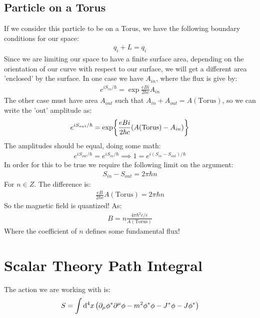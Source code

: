 \documentclass[12pt]{article}
\newcommand{\D}{\partial}
\begin{document}
\subsection{Particle on a Torus}
If we consider this particle to be on a Torus, we have the following boundary conditions for our space:
\begin{align*}
  q_i+L=q_i
\end{align*}
Since we are limiting our space to have a finite surface area, depending on the orientation of our curve with respect to our surface, we will get a different area 'enclosed' by the surface. In one case we have $A_{in}$, where the flux is give by:
\begin{align*}
  e^{iS_{in}/\hbar}=\exp{\frac{eBi}{2\hbar c}A_{in}}
\end{align*}
The other case must have area $A_{out}$ such that $A_{in}+A_{out}=A(\text{Torus})$, so we can write the 'out' amplitude as:
\begin{align*}
  e^{iS_{out}/\hbar}=\exp{\frac{eBi}{2\hbar c}\qty(A(\text{Torus})-A_{in})}
\end{align*}
The amplitudes should be equal, doing some math:
\begin{align*}
  e^{iS_{out}/\hbar}=e^{iS_{in}/\hbar}\implies 1=e^{i(S_{in}-S_{out})/\hbar}
\end{align*}
In order for this to be true we require the following limit on the argument:
\begin{align*}
  S_{in}-S_{out}=2\pi\hbar n
\end{align*}
For $n\in Z$. The difference is:
\begin{align*}
  \frac{eB}{2\hbar c}A(\text{Torus})=2\pi\hbar n
\end{align*}
So the magnetic field is quantized! As:
\begin{align*}
  \boxed{B=n\frac{4\pi\hbar^2c/e}{A(\text{Torus})}}
\end{align*}
Where the coefficient of $n$ defines some fundamental flux!
\section{Scalar Theory Path Integral}
The action we are working with is:
\begin{align*}
  S=\int\dd[4]{x}\qty(\D_\mu\phi^*\D^\mu\phi-m^2\phi^*\phi-J^*\phi-J\phi^*)
\end{align*}
\end{document}

